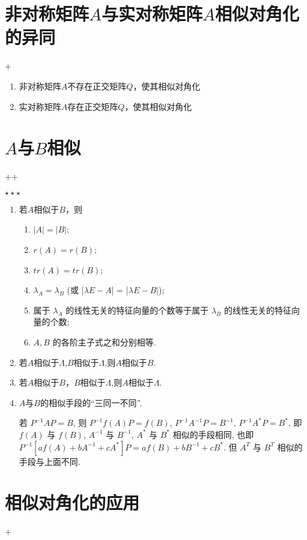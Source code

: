 \section{非对称矩阵$A$与实对称矩阵$A$相似对角化的异同}
\DOne+\DTwoOne

\begin{enumerate}
    \item 非对称矩阵$A$不存在正交矩阵$Q$，使其相似对角化
    \item 实对称矩阵$A$存在正交矩阵$Q$，使其相似对角化
\end{enumerate}
\section{$A$与$B$相似}
\DOne+\DTwoOne+\PFour

$\star \star \star$

\begin{enumerate}
    \item 若$A$相似于$B$，则
          \begin{enumerate}
              \item $|A| = |B|$;
              \item $r(A)=r(B)$;
              \item $tr(A)=tr(B)$;
              \item $\lambda_{A} = \lambda_{B}$ (或 |$\lambda E - A$| = |$\lambda E - B$|);
              \item 属于 $\lambda_{A}$ 的线性无关的特征向量的个数等于属于 $\lambda_{B}$ 的线性无关的特征向量的个数;
              \item $A, B$  的各阶主子式之和分别相等.
          \end{enumerate}

    \item 若$A$相似于$\Lambda$,$B$相似于$\Lambda$,则$A$相似于$B$.
    \item 若$A$相似于$B$，$B$相似于$\Lambda$,则$A$相似于$\Lambda$.
    \item $A$与$B$的相似手段的“三同一不同”.

          若 $P^{-1}AP = B$, 则 $P^{-1}f(A)P = f(B)$, $P^{-1}A^{-1}P = B^{-1}$, $P^{-1}A^{*}P = B^{*}$, 即 $f(A)$ 与 $f(B)$, $A^{-1}$ 与 $B^{-1}$, $A^{*}$ 与 $B^{*}$ 相似的手段相同, 也即 $P^{-1}[af(A) + bA^{-1} + cA^{*}]P = af(B) + bB^{-1} + cB^{*}$. 但 $A^{T}$ 与 $B^{T}$ 相似的手段与上面不同.
\end{enumerate}
\section{相似对角化的应用}
\DOne+\DTwoTwo


